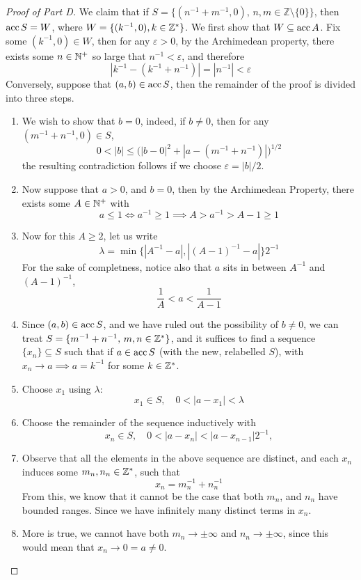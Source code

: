 \documentclass[../../main.tex]{subfiles}
\begin{document}
\begin{proof}[Proof of Part D]
    We claim that if $S=\{(n^{-1}+m^{-1},0),\,n,m\in\mathbb{Z}\setminus\{0\}\}$, then $\operatorname{acc}{S}=W$, where $W = \{(k^{-1},0),k\in\mathbb{Z}^*\}$. We first show that $W\subseteq \operatorname{acc}{A}$. Fix some $(k^{-1},0)\in W$, then for any $\varepsilon>0$, by the Archimedean property, there exists some $n\in\mathbb{N}^+$ so large that $n^{-1}<\varepsilon$, and therefore
    \[
        |k^{-1}-(k^{-1}+n^{-1})|=|n^{-1}|<\varepsilon
    \]
    Conversely, suppose that $(a,b)\in\operatorname{acc}{S}$, then the remainder of the proof is divided into three steps.
    \begin{enumerate}
        \item We wish to show that $b=0$, indeed, if $b\neq 0$, then for any $(m^{-1}+n^{-1},0)\in S$, 
        \[
            0<|b|\leq \biggl(|b-0|^2+|a-(m^{-1}+n^{-1})|\biggr)^{1/2}
        \]
        the resulting contradiction follows if we choose $\varepsilon=|b|/2$.
        \item Now suppose that $a>0$, and $b=0$, then by the Archimedean Property, there exists some $A\in \mathbb{N}^+$ with\[a\leq 1\iff a^{-1}\geq 1\implies A>a^{-1}>A-1\geq 1\]
        \item Now for this $A\geq 2$, let us write 
        \[\lambda = \min\biggl\{|A^{-1}-a|,|(A-1)^{-1}-a|\biggr\}2^{-1}\]
        For the sake of completness, notice also that $a$ sits in between $A^{-1}$ and $(A-1)^{-1}$, 
        \[
            \dfrac{1}{A}<a<\dfrac{1}{A-1}
        \]
        \item Since $(a,b)\in\operatorname{acc}{S}$, and we have ruled out the possibility of $b\neq 0$, we can treat $S=\{m^{-1}+n^{-1},\,m,n\in\mathbb{Z}^*\}$, and it suffices to find a sequence $\{x_n\}\subseteq S$ such that if $a\in\operatorname{acc}{S}$ (with the new, relabelled $S$), with $x_n\to a\implies a=k^{-1}$ for some $k\in\mathbb{Z}^*$.
        \item Choose $x_1$ using $\lambda$:\[x_1\in S,\quad0<|a-x_1|<\lambda\]
        \item Choose the remainder of the sequence inductively with
        \[
          x_n\in S,\quad 0<|a-x_n|<|a-x_{n-1}|2^{-1},  
        \]
        \item Observe that all the elements in the above sequence are distinct, and each $x_n$ induces some $m_n,n_n\in\mathbb{Z}^*$, such that
        \[x_n=m_n^{-1}+n_n^{-1}\]
        From this, we know that it cannot be the case that both $m_n$, and $n_n$ have bounded ranges. Since we have infinitely many distinct terms in $x_n$.
        \item More is true, we cannot have both $m_n\to\pm\infty$ and $n_n\to\pm\infty$, since this would mean that $x_n\to 0=a\neq 0$.

\end{enumerate}
\end{proof}
\end{document}
